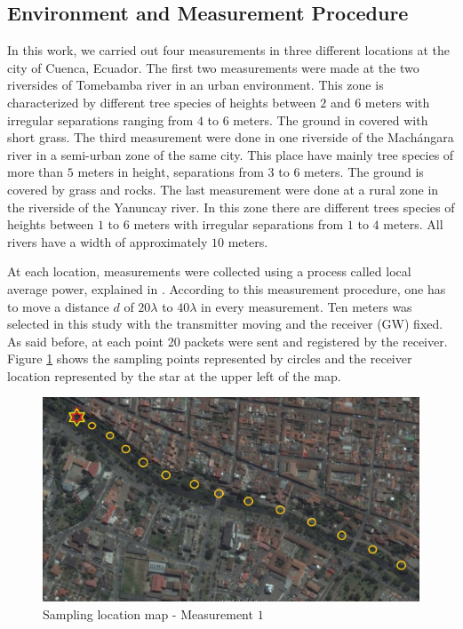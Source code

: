 \subsection{Environment and Measurement Procedure}

In this work, we carried out four measurements in three different locations at the city of Cuenca, Ecuador. The first two measurements were made at the two riversides of Tomebamba river in an urban environment. This zone is characterized by different tree species of heights between $2$ and $6$ meters with irregular separations ranging from $4$ to $6$ meters. The ground in covered with short grass. 
The third measurement were done in one riverside of the Machángara river in a semi-urban zone of the same city. This place have mainly tree species of more than $5$ meters in height, separations from $3$ to $6$ meters. The ground is covered by grass and rocks. The last measurement were done at a rural zone in the riverside of the Yanuncay river. In this zone there are different trees species of heights between $1$ to $6$ meters with irregular separations from $1$ to $4$ meters. All rivers have a width of approximately $10$ meters.

 At each location, measurements were collected using a process called local average power, explained in \cite{Lee1985}. According to this measurement procedure, one has to move a distance $d$ of $20\lambda$ to $40\lambda$ in every measurement. Ten meters was selected in this study with the transmitter moving and the receiver (GW) fixed. As said before, at each point 20 packets were sent and registered by the receiver. Figure \ref{fig:locationmap} shows the sampling points represented by circles and the receiver location represented by the star at the upper left of the map.

\begin{figure}[h!]
  \centering
  \includegraphics[width=1\linewidth]{map}
  \caption{Sampling location map - Measurement $1$}
  \label{fig:locationmap}
\end{figure}

